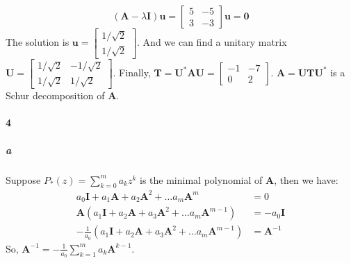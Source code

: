\documentclass[22pt]{article}
\begin{document}
	\begin{equation}
	 	(\mathbf{A} - \lambda\mathbf{I})\mathbf{u} = \left[\begin{array}{cc} 5&-5 \\ 3&-3 \end{array}\right]\mathbf{u} = \mathbf{0} 
	 \end{equation} 
	 The solution is $\mathbf{u} = \left[\begin{array}{c} 1/\sqrt{2} \\ 1/\sqrt{2} \end{array}\right]$. And we can find a unitary matrix $\mathbf{U} = \left[\begin{array}{cc} 1/\sqrt{2}& -1/\sqrt{2}\\ 1/\sqrt{2} & 1/\sqrt{2} \end{array}\right]$.
	 Finally, $\mathbf{T} = \mathbf{U}^*\mathbf{AU} = \left[\begin{array}{cc} -1& -7\\ 0 & 2 \end{array}\right]$. $\mathbf{A} = \mathbf{UTU}^*$ is a Schur decomposition of $\mathbf{A}$.

	 \paragraph{4}
	 \subparagraph{a} Suppose $P_*(z) = \sum_{k=0}^{m}a_kz^k$ is the minimal polynomial of $\mathbf{A}$, then we have:
	 \begin{align}
	 	a_0\mathbf{I}+a_1\mathbf{A}+a_2\mathbf{A}^2+\dots a_m\mathbf{A}^m & = 0\\
	 	\mathbf{A}(a_1\mathbf{I}+a_2\mathbf{A}+a_3\mathbf{A}^2+\dots a_m\mathbf{A}^{m-1}) & = -a_0\mathbf{I}\\
	 	-\frac{1}{a_0}(a_1\mathbf{I}+a_2\mathbf{A}+a_3\mathbf{A}^2+\dots a_m\mathbf{A}^{m-1}) & = \mathbf{A}^{-1}
	 \end{align}
	 So, $\mathbf{A}^{-1} = -\frac{1}{a_0}\sum_{k=1}^{m}a_k\mathbf{A}^{k-1}$.
\end{document}
